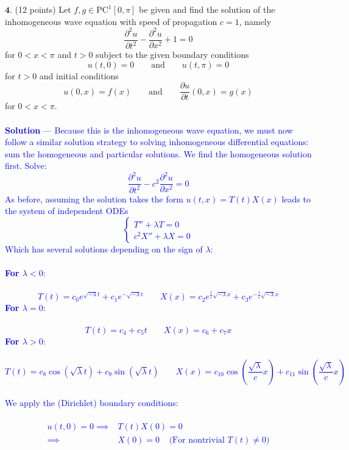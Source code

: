 \documentclass[12pt]{article}
\begin{document}
\noindent $\textbf{4}$. (12 points)  Let $f, g \in \mathrm{PC}^1[0,\pi]$ be given and find the solution of the inhomogeneous wave equation with speed of propagation $c=1$, namely
$$\frac{\partial^2 u}{\partial t^2} - \frac{\partial^2 u}{\partial x^2} +1 = 0$$
for $0 < x < \pi$ and $t > 0$ 
subject to the given boundary conditions
$$u(t, 0) = 0 \qquad \mathrm{and} \qquad u(t,\pi) = 0$$
for $t > 0$ and initial conditions
$$u(0,x) = f(x) \qquad \mathrm{and} \qquad \frac{\partial u}{\partial t} (0,x) = g(x)$$
for $0 < x < \pi$. \\ \\
\textcolor{blue}{\textbf{Solution} — Because this is the inhomogeneous wave equation, we must now follow a similar solution strategy to solving inhomogeneous differential equations: sum the homogeneous and particular solutions. We find the homogeneous solution first. Solve:
$$\frac{\partial^2 u}{\partial t^2} - c^2 \frac{\partial^2 u}{\partial x^2}  = 0$$
As before, assuming the solution takes the form $u(t,x) = T(t)X(x)$ leads to the system of independent ODEs
$$\begin{cases}
T'' + \lambda T = 0 \\
c^2 X'' +\lambda X = 0
\end{cases}$$
Which has several solutions depending on the sign of $\lambda$: \\ \\
\textbf{For $\lambda < 0$}: \\ \\
$$T(t) = c_0 e^{\sqrt{-\lambda} t} + c_1 e^{ -\sqrt{-\lambda} t} \;\;\;\;\;\;\; X(x) = c_2 e^{\frac{1}{c} \sqrt{-\lambda} x} + c_3 e^{-\frac{1}{c} \sqrt{-\lambda} x}$$
\textbf{For $\lambda = 0$}: \\ \\
$$T(t) = c_4 + c_5 t \;\;\;\;\;\;\; X(x) = c_6 + c_7 x$$
\textbf{For $\lambda > 0$}: \\ \\
$$T(t) = c_8 \cos \left( \sqrt{\lambda} t \right) + c_9 \sin \left( \sqrt{\lambda} t \right)  \;\;\;\;\;\;\; X(x) = c_{10} \cos \left( \frac{\sqrt{\lambda}}{c} x \right) + c_{11} \sin \left( \frac{\sqrt{\lambda}}{c} x \right)$$ \\
We apply the (Dirichlet) boundary conditions: \\ \\
\begin{align*}
u(t,0) = 0 \implies& T(t)X(0) = 0 \\
\implies& X(0) = 0 \;\;\;\; \text{(For nontrivial $T(t) \neq 0$)} \\

\end{align*}}
\end{document}
